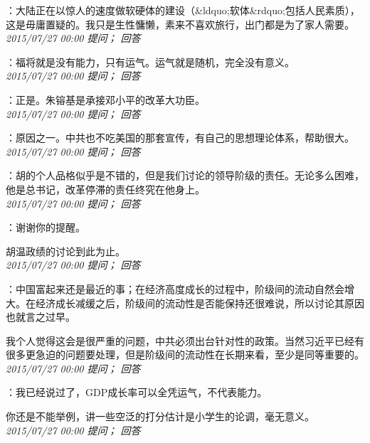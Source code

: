 \documentclass[twocolumn]{ctexart}
\begin{document}
：大陆正在以惊人的速度做软硬体的建设（\&ldquo;软体\&rdquo;包括人民素质），这是毋庸置疑的。我只是生性慵懒，素来不喜欢旅行，出门都是为了家人需要。\\

\textit{\hfill\noindent\small 2015/07/27 00:00 提问； 回答}

：福将就是没有能力，只有运气。运气就是随机，完全没有意义。\\

\textit{\hfill\noindent\small 2015/07/27 00:00 提问； 回答}

：正是。朱镕基是承接邓小平的改革大功臣。\\

\textit{\hfill\noindent\small 2015/07/27 00:00 提问； 回答}

：原因之一。中共也不吃美国的那套宣传，有自己的思想理论体系，帮助很大。\\

\textit{\hfill\noindent\small 2015/07/27 00:00 提问； 回答}

：胡的个人品格似乎是不错的，但是我们讨论的领导阶级的责任。无论多么困难，他是总书记，改革停滞的责任终究在他身上。\\

\textit{\hfill\noindent\small 2015/07/27 00:00 提问； 回答}

：谢谢你的提醒。

胡温政绩的讨论到此为止。\\

\textit{\hfill\noindent\small 2015/07/27 00:00 提问； 回答}

：中国富起来还是最近的事；在经济高度成长的过程中，阶级间的流动自然会增大。在经济成长减缓之后，阶级间的流动性是否能保持还很难说，所以讨论其原因也就言之过早。

我个人觉得这会是很严重的问题，中共必须出台针对性的政策。当然习近平已经有很多更急迫的问题要处理，但是阶级间的流动性在长期来看，至少是同等重要的。\\

\textit{\hfill\noindent\small 2015/07/27 00:00 提问； 回答}

：我已经说过了，GDP成长率可以全凭运气，不代表能力。

你还是不能举例，讲一些空泛的打分估计是小学生的论调，毫无意义。\\

\textit{\hfill\noindent\small 2015/07/27 00:00 提问； 回答}
\end{document}
